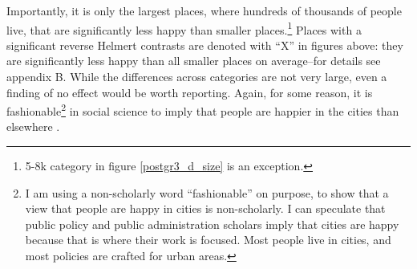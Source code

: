 \documentclass[12pt, letterpaper]{article}
\begin{document}
\begin{spacing}{1.9}
Importantly, it is only the largest places, where hundreds
of thousands of people live, that are significantly less happy than smaller
places.\footnote{5-8k category in figure \ref{postgr3_d_size} is an exception.} Places with a
significant reverse Helmert contrasts are denoted with ``X'' in figures above:
they are significantly less happy than all smaller places on average--for
details see appendix B.   
%
 While the differences across categories are not very large,
even a finding of no effect would be worth reporting. Again, for some  reason, it is
 fashionable\footnote{I am using a non-scholarly word ``fashionable''
   on purpose, to show that a view that people are happy in cities
   is non-scholarly.
%
 I can speculate that public policy and public
   administration scholars imply that cities are happy because that is where
   their work is focused. Most people live in cities, and most
   policies are crafted for urban areas. %

} in social science to imply that people are happier in the cities than elsewhere
\citep[e.g.,][]{jacobs93, glaeser11}.  






\end{spacing}
\end{document}

